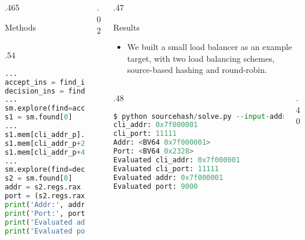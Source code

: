 \documentclass[final,hyperref={pdfpagelabels=false}]{beamer}
\begin{document}
\begin{frame}[t,fragile]
\begin{columns}[t]
\begin{column}{.465\textwidth}
\begin{block}{Methods}
\begin{columns}
\begin{column}{.54\textwidth}
\begin{lstlisting}[language=python,basicstyle=\footnotesize\ttfamily]
...
accept_ins = find_ins(call_accept)
decision_ins = find_ins(call_select_server)
...
sm.explore(find=accept_ins)
s1 = sm.found[0]
...
s1.mem[cli_addr_p].short      = 2
s1.mem[cli_addr_p+2].uint16_t = 12345
s1.mem[cli_addr_p+4].uint32_t = 0x7f000001
...
sm.explore(find=decision_ins)
s2 = sm.found[0]
addr = s2.regs.rax & 0xffffffff
port = (s2.regs.rax & 0xffffffff00000000) >> 32
print('Addr:', addr)
print('Port:', port)
print('Evaluated addr:', s2.solver.eval(addr))
print('Evaluated port:', s2.solver.eval(port))
\end{lstlisting}
\end{column}

\end{columns}
\end{block}


\end{column} %

\begin{column}{.02\textwidth}\end{column} %

\begin{column}{.47\textwidth} %


\begin{block}{Results}

\begin{itemize}
\item We built a small load balancer as an example target, with two load
    balancing schemes, source-based hashing and round-robin.
\end{itemize}

\begin{columns}
\begin{column}{.48\textwidth}
\begin{lstlisting}[language=python,basicstyle=\footnotesize\ttfamily]
$ python sourcehash/solve.py --input-addr 0x7f000001 --input-port 11111
cli_addr: 0x7f000001
cli_port: 11111
Addr: <BV64 0x7f000001>
Port: <BV64 0x2328>
Evaluated cli_addr: 0x7f000001
Evaluated cli_port: 11111
Evaluated addr: 0x7f000001
Evaluated port: 9000
\end{lstlisting}
\end{column}
\begin{column}{.40\textwidth}
\end{column}
\end{columns}


\end{block}
\end{column}
\end{columns}
\end{frame}
\end{document}
